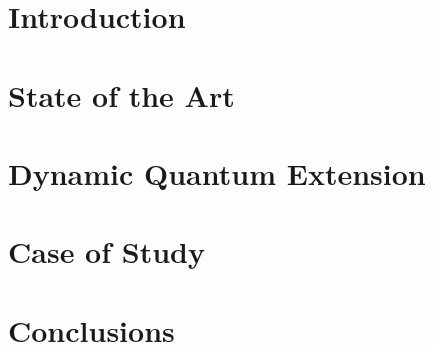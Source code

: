 \documentclass[
	12pt, 
	english,
	oneside,
	onehalfspacing, %
	hidelinks,
    footinclude=true,
    headinclude=true
]{misc/MastersDoctoralThesis} %
\begin{document}
\mainmatter %
\pagestyle{thesis} %


\chapter{Introduction}
\label{cap:Intro}


\chapter{State of the Art}
\label{cap:SoA}



\chapter{Dynamic Quantum Extension}
\label{cap:DynamicQuantumExtension}


% 

\chapter{Case of Study}
\label{cap:CaseOfStudy}



\chapter{Conclusions}
\label{cap:Conclusions}

\end{document}
